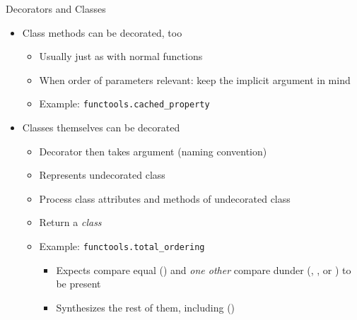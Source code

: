 
\begin{frame}{Decorators and Classes}
%
\begin{itemize}
\item Class methods can be decorated, too
	\begin{itemize}
	\item Usually just as with normal functions
	\item When order of parameters relevant: keep the implicit  argument in mind
	\item Example: \texttt{functools.cached\_property}
	\end{itemize}
\item Classes themselves can be decorated
	\begin{itemize}
	\item Decorator then takes argument  (naming convention)
	\item Represents undecorated class
	\item Process class attributes and methods of undecorated class
	\item Return a \emph{class}
	\item Example: \texttt{functools.total\_ordering}
		\begin{itemize}
		\item Expects compare equal () and \emph{one other} compare dunder (, ,  or ) to be present
		\item Synthesizes the rest of them, including ()
		\end{itemize}
	\end{itemize}
\end{itemize}
%
\end{frame}


